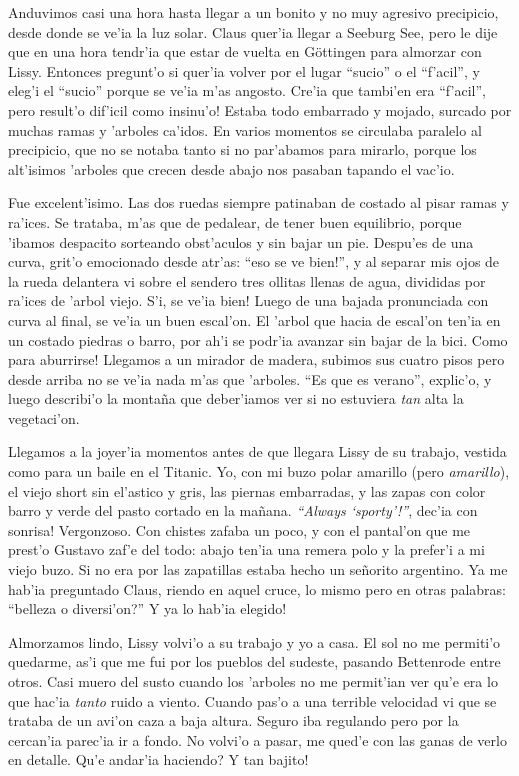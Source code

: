 Anduvimos casi una hora hasta llegar a un bonito y no muy agresivo precipicio,
desde donde se ve'ia la luz solar. Claus quer'ia llegar a Seeburg See, pero le
dije que en una hora tendr'ia que estar de vuelta en G\"ottingen para almorzar
con Lissy. Entonces pregunt'o si quer'ia volver por el lugar ``sucio'' o el
``f'acil'', y eleg'i el ``sucio'' porque se ve'ia m'as angosto. \textexclamdown
Cre'ia que tambi'en era ``f'acil'', pero result'o dif'icil como insinu'o! Estaba
todo embarrado y mojado, surcado por muchas ramas y 'arboles ca'idos. En varios
momentos se circulaba paralelo al precipicio, que no se notaba tanto si no
par'abamos para mirarlo, porque los alt'isimos 'arboles que crecen desde abajo
nos pasaban tapando el vac'io.

Fue excelent'isimo. Las dos ruedas siempre patinaban de costado al pisar ramas y
ra'ices. Se trataba, m'as que de pedalear, de tener buen equilibrio, porque
'ibamos despacito sorteando obst'aculos y sin bajar un pie. Despu'es de una
curva, grit'o emocionado desde atr'as: ``\textexclamdown eso se ve bien!'', y al
separar mis ojos de la rueda delantera vi sobre el sendero tres ollitas llenas
de agua, divididas por ra'ices de 'arbol viejo. \textexclamdown S'i, se ve'ia
bien! Luego de una bajada pronunciada con curva al final, se ve'ia un buen
escal'on. El 'arbol que hacia de escal'on ten'ia en un costado piedras o barro,
por ah'i se podr'ia avanzar sin bajar de la bici. \textexclamdown Como para
aburrirse! Llegamos a un mirador de madera, subimos sus cuatro pisos pero desde
arriba no se ve'ia nada m'as que 'arboles. ``Es que es verano'', explic'o, y
luego describi'o la monta\~na que deber'iamos ver si no estuviera \emph{tan}
alta la vegetaci'on.

Llegamos a la joyer'ia momentos antes de que llegara Lissy de su trabajo,
vestida como para un baile en el Titanic. Yo, con mi buzo polar amarillo (pero
\emph{amarillo}), el viejo short sin el'astico y gris, las piernas embarradas, y
las zapas con color barro y verde del pasto cortado en la ma\~nana.
\textexclamdown \emph{``Always `sporty'!''}, dec'ia con sonrisa! Vergonzoso. Con
chistes zafaba un poco, y con el pantal'on que me prest'o Gustavo zaf'e del
todo: abajo ten'ia una remera polo y la prefer'i a mi viejo buzo. Si no era por
las zapatillas estaba hecho un se\~norito argentino. Ya me hab'ia preguntado
Claus, riendo en aquel cruce, lo mismo pero en otras palabras:
``\textquestiondown belleza o diversi'on?'' \textexclamdown Y ya lo hab'ia
elegido!

Almorzamos lindo, Lissy volvi'o a su trabajo y yo a casa. El sol no me permiti'o
quedarme, as'i que me fui por los pueblos del sudeste, pasando Bettenrode entre
otros. Casi muero del susto cuando los 'arboles no me permit'ian ver qu'e era lo
que hac'ia \emph{tanto} ruido a viento. Cuando pas'o a una terrible velocidad vi
que se trataba de un avi'on caza a baja altura. Seguro iba regulando pero por la
cercan'ia parec'ia ir a fondo. No volvi'o a pasar, me qued'e con las ganas de
verlo en detalle. \textquestiondown Qu'e andar'ia haciendo? \textexclamdown Y
tan bajito!

